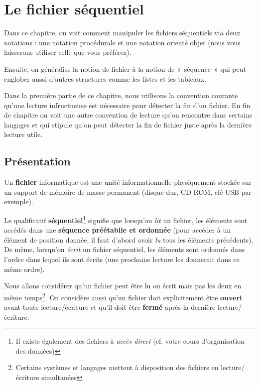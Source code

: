 \chapter{Le fichier séquentiel}



Dans ce chapitre, on voit comment manipuler les fichiers séquentiels via
deux notations : une notation procédurale et une notation orienté objet
(nous vous laisserons utiliser celle que vous préférez). 

Ensuite, on généralise la notion de fichier à la notion de «~séquence~»
qui peut englober aussi d'autres structures comme les
listes et les tableaux.

Dans la première partie de ce chapitre, nous utilisons la convention
courante qu'une lecture infructueuse est nécessaire
pour détecter la fin d'un fichier. En fin de chapitre
on voit une autre convention de lecture qu'on
rencontre dans certains langages et qui stipule qu'on
peut détecter la fin de fichier juste après la dernière lecture utile.

\section{Présentation}

Un \textbf{fichier} informatique est une unité informationnelle
physiquement stockée sur un support de mémoire de masse permanent
(disque dur, CD-ROM, clé USB par exemple). 


Le qualificatif \textbf{séquentiel}\footnote{Il existe également des
fichiers à \textit{accès direct} (cf. votre cours
d'organisation des données)} signifie que
lorsqu'on \textit{lit} un fichier, les éléments sont
accédés dans une \textbf{séquence préétablie et ordonnée} (pour accéder
à un élément de position donnée, il faut d’abord avoir \textit{lu} tous
les éléments précédents). De même, lorsqu'on
\textit{écrit} un fichier séquentiel, les éléments sont ordonnés dans
l'ordre dans lequel ils sont écrits (une prochaine
lecture les donnerait dans ce même ordre).

Nous allons considérer qu'un fichier peut être lu ou
écrit mais pas les deux en même temps\footnote{Certains systèmes et
langages mettent à disposition des fichiers en lecture/écriture
simultanées}. On considère aussi qu'un fichier doit
explicitement être \textbf{ouvert} avant toute lecture/écriture et
qu'il doit être \textbf{fermé} après la dernière
lecture/écriture.

